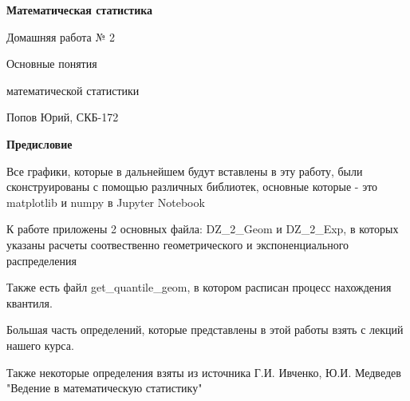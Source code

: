 \documentclass[a4paper,12pt, oneside]{book}
\begin{document}
	\pagestyle{plain}
	
	\begin{titlepage}	
		\begin{center}
			{\Huge \textbf{Математическая статистика}}
			\vspace{30mm}
			
			{\Huge Домашняя работа № 2 \\}
			\vspace{30mm}
			
			{\huge Основные понятия 
				
				математической статистики}
			\vspace{30mm}
			
			{\Large Попов Юрий, СКБ-172}
		\end{center}
	\end{titlepage}
	
	
	
	\begin{spacing}{0.99}          
		\tableofcontents %
	\end{spacing}

\newpage
\begin{center}
	{\Huge{\bf{Предисловие}}}
\end{center}

\vspace{5mm}
Все графики, которые в дальнейшем будут вставлены в эту работу, были сконструированы с помощью различных библиотек, основные которые - это matplotlib  и numpy в Jupyter Notebook

К работе приложены 2 основных файла: DZ\_2\_Geom и DZ\_2\_Exp, в которых указаны расчеты  соотвественно геометрического и  экспоненциального распределения

Также есть файл get\_quantile\_geom, в котором расписан процесс нахождения квантиля.
\vspace{5mm}

Большая часть определений, которые представлены в этой работы взять с лекций нашего курса. 
\vspace{5mm}

Также некоторые определения взяты из источника   Г.И. Ивченко, Ю.И. Медведев \\
"Ведение в математическую статистику"

\setcounter{secnumdepth}{-1} %
 
\end{document}
